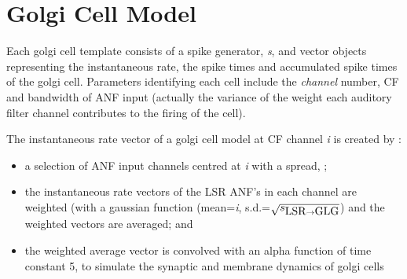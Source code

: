 \section{Golgi Cell Model}

Each golgi cell template consists of a spike generator, \emph{s}, and vector
objects representing the instantaneous rate, the spike times and
accumulated  spike times of the golgi cell. Parameters identifying
each cell include the \emph{channel} number, CF and bandwidth of ANF
input (actually the variance of the weight each auditory filter
channel contributes to the firing of the cell).

The instantaneous rate vector of a golgi cell model at CF channel
\emph{i} is created by :
\begin{itemize}
 \item a selection of ANF input channels centred at \emph{i} with a
 spread, \sLSRGLG;
 \item the instantaneous rate vectors of the LSR ANF's in each channel
 are weighted (with a gaussian function (mean=\emph{i},
 s.d.=$\sqrt{\protect s_{\protect\mbox{LSR} \to \mbox{GLG}}}$) and the weighted vectors are averaged; and
 \item the weighted average vector is convolved with an alpha function
 of time constant 5, to simulate the synaptic and membrane dynamics of
 golgi cells
\end{itemize}

 \medskip{}

